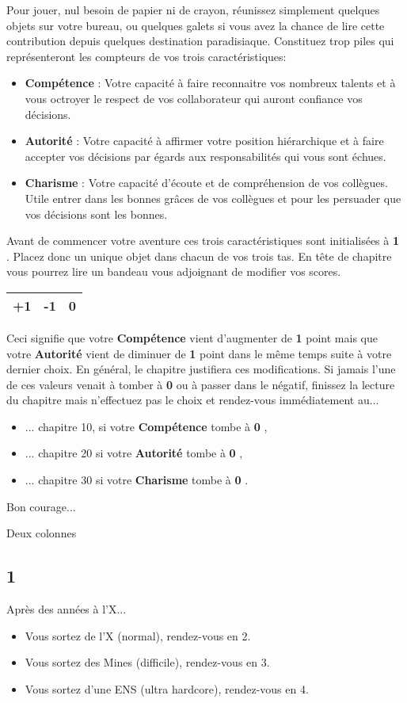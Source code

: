 \documentclass[12pt,a4paper,titlepage]{article}
\newcommand{\Competence}{\textbf{Compétence} }
\newcommand{\Autorite}{\textbf{Autorité} }
\newcommand{\Charisme}{\textbf{Charisme} }
\newcommand{\n}[1]{\textbf{#1} }
\newcommand{\update}[3]{
\begin{center}
\begin{tabular}{|c|c|c|}
\hline #1 & #2 & #3 \\ \hline
\end{tabular}
\end{center}
}
\begin{document}
Pour jouer, nul besoin de papier ni de crayon, réunissez simplement quelques objets sur votre bureau, ou quelques galets si vous avez la chance de lire cette contribution depuis quelques destination paradisiaque. Constituez trop piles qui représenteront les compteurs de vos trois caractéristiques:
\begin{itemize}
\item \Competence : Votre capacité à faire reconnaitre vos nombreux talents et à vous octroyer le  respect de vos collaborateur qui auront confiance vos décisions.
\item \Autorite : Votre capacité à affirmer votre position hiérarchique et à faire accepter vos décisions par égards aux responsabilités qui vous sont échues.
\item \Charisme : Votre capacité d'écoute et de compréhension de vos collègues. Utile entrer dans les bonnes grâces de vos collègues et pour les persuader que vos décisions sont les bonnes.
\end{itemize}
Avant de commencer votre aventure ces trois caractéristiques sont initialisées à \n{1}. Placez donc un unique objet dans chacun
de vos trois tas. En tête de chapitre vous pourrez lire un bandeau vous adjoignant de modifier vos scores.
\update{+1}{-1}{0}
Ceci signifie que votre \Competence vient d'augmenter de \n{1} point mais que votre \Autorite vient de diminuer de \n{1} point dans le même temps suite à votre dernier choix. En général, le chapitre justifiera ces modifications.
Si jamais l'une de ces valeurs venait à tomber à \n{0} ou à passer dans le négatif, finissez la lecture du chapitre mais n'effectuez pas le choix et rendez-vous immédiatement au...
\begin{itemize}
\item ... chapitre 10, si votre \Competence tombe à \n{0},
\item ... chapitre 20 si votre \Autorite tombe à \n{0},
\item ... chapitre 30 si votre \Charisme tombe à \n{0}.
\end{itemize}
Bon courage...

\newpage


Deux colonnes


\label{n1}
\subsection*{1}
Après des années à l'X... \\
\begin{itemize}
\item Vous sortez de l'X (normal), rendez-vous en 2.
\item Vous sortez des Mines (difficile), rendez-vous en 3.
\item Vous sortez d'une ENS (ultra hardcore), rendez-vous en 4.
\end{itemize}
\end{document}

